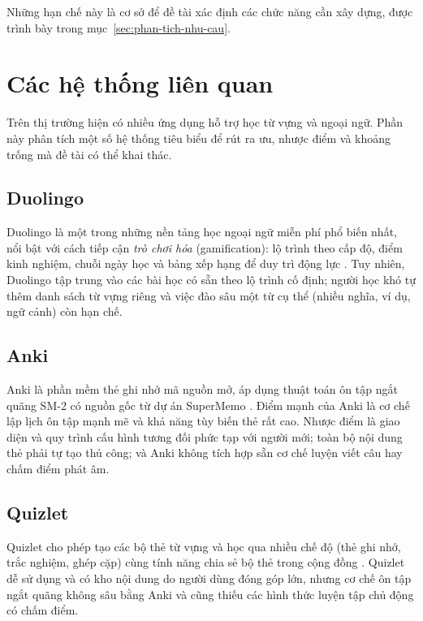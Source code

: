 Những hạn chế này là cơ sở để đề tài xác định các chức năng cần xây dựng,
được trình bày trong mục~\ref{sec:phan-tich-nhu-cau}.

\section{Các hệ thống liên quan}
\label{sec:he-thong-lien-quan}

Trên thị trường hiện có nhiều ứng dụng hỗ trợ học từ vựng và ngoại ngữ.
Phần này phân tích một số hệ thống tiêu biểu để rút ra ưu, nhược điểm và
khoảng trống mà đề tài có thể khai thác.

\subsection{Duolingo}

Duolingo là một trong những nền tảng học ngoại ngữ miễn phí phổ biến nhất,
nổi bật với cách tiếp cận \textit{trò chơi hóa} (gamification): lộ trình
theo cấp độ, điểm kinh nghiệm, chuỗi ngày học và bảng xếp hạng để duy trì
động lực \cite{vonahn2013duolingo}. Tuy nhiên, Duolingo tập trung vào các
bài học có sẵn theo lộ trình cố định; người học khó tự thêm danh sách từ
vựng riêng và việc đào sâu một từ cụ thể (nhiều nghĩa, ví dụ, ngữ cảnh)
còn hạn chế.

\subsection{Anki}

Anki là phần mềm thẻ ghi nhớ mã nguồn mở, áp dụng thuật toán ôn tập ngắt
quãng SM-2 có nguồn gốc từ dự án SuperMemo \cite{wozniak1990optimization,
anki}. Điểm mạnh của Anki là cơ chế lập lịch ôn tập mạnh mẽ và khả năng
tùy biến thẻ rất cao. Nhược điểm là giao diện và quy trình cấu hình tương
đối phức tạp với người mới; toàn bộ nội dung thẻ phải tự tạo thủ công; và
Anki không tích hợp sẵn cơ chế luyện viết câu hay chấm điểm phát âm.

\subsection{Quizlet}

Quizlet cho phép tạo các bộ thẻ từ vựng và học qua nhiều chế độ (thẻ ghi
nhớ, trắc nghiệm, ghép cặp) cùng tính năng chia sẻ bộ thẻ trong cộng đồng
\cite{quizlet}. Quizlet dễ sử dụng và có kho nội dung do người dùng đóng
góp lớn, nhưng cơ chế ôn tập ngắt quãng không sâu bằng Anki và cũng thiếu
các hình thức luyện tập chủ động có chấm điểm.

